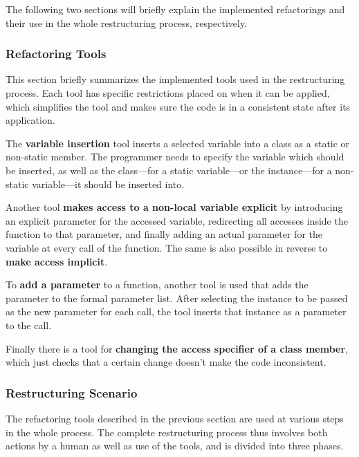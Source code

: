 \documentclass[conference,compsoc,a4paper]{IEEEtran}
\begin{document}
The following two sections will briefly explain the implemented refactorings and their use in the whole restructuring 
process, respectively.

\subsubsection{Refactoring Tools}

This section briefly summarizes the implemented tools used in the restructuring process. Each tool has specific 
restrictions placed on when it can be applied, which simplifies the tool and makes sure the code is in a consistent 
state after its application.

The \textbf{variable insertion} tool inserts a selected variable into a class as a static or non-static member. The 
programmer needs to specify the variable which should be inserted, as well as the class---for a static variable---or 
the instance---for a non-static variable---it should be inserted into.

Another tool \textbf{makes access to a non-local variable explicit} by introducing an explicit parameter for the 
accessed variable, redirecting all accesses inside the function to that parameter, and finally adding an actual 
parameter for the variable at every call of the function. The same is also possible in reverse to \textbf{make access 
implicit}.

To \textbf{add a parameter} to a function, another tool is used that adds the parameter to the formal parameter list. 
After selecting the instance to be passed as the new parameter for each call, the tool inserts that instance as a 
parameter to the call.

Finally there is a tool for \textbf{changing the access specifier of a class member}, which just checks that a certain 
change doesn't make the code inconsistent.

\subsubsection{Restructuring Scenario}

The refactoring tools described in the previous section are used at various steps in the whole process. The complete 
restructuring process thus involves both actions by a human as well as use of the tools, and is divided into three 
phases.
\end{document}
